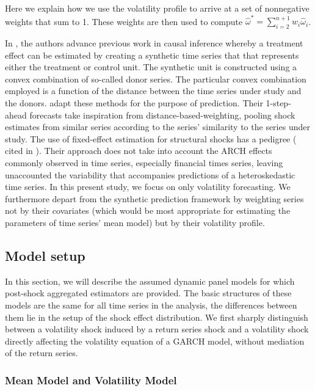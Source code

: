 \documentclass[11pt]{article}
\theoremstyle{definition}
\begin{document}
Here we explain how we use the volatility profile to arrive at a set of nonnegative weights that sum to 1.  These weights are then used to compute $\hat\omega^{*} = \sum^{n+1}_{i=2}w_{i}\hat\omega_{i}$.


In \citet{abadie2010synthetic}, the authors advance previous work in causal inference whereby a treatment effect can be estimated by creating a synthetic time series that that represents either the treatment or control unit.  The synthetic unit is constructed using a convex combination of so-called donor series.  The particular convex combination employed is a function of the distance between the time series under study and the donors. \citet{lin2021minimizing} adapt these methods for the purpose of prediction.  Their 1-step-ahead forecasts take inspiration from distance-based-weighting, pooling shock estimates from similar series according to the series' similarity to the series under study.  The use of fixed-effect estimation for structural shocks has a pedigree (\citet{romer1989does} cited in \citet{kilian2017structural}).  Their approach does not take into account the ARCH effects commonly observed in time series, especially financial times series, leaving unaccounted the variability that accompanies predictions of a heteroskedastic time series.  In this present study, we focus on only volatility forecasting.  We furthermore depart from the synthetic prediction framework by weighting series not by their covariates (which would be most appropriate for estimating the parameters of time series' mean model) but by their volatility profile.


\subsection{Model setup}
\label{modelsetup}
In this section, we will describe the assumed dynamic panel models for which 
post-shock aggregated estimators are provided. The basic structures of these models 
are the same for all time series in the analysis, the differences between them lie in the setup of the shock effect distribution.  We first sharply distinguish between a volatility shock induced by a return series shock and a volatility shock directly affecting the volatility equation of a GARCH model, without mediation of the return series.

\subsubsection{Mean Model and Volatility Model}
\end{document}
